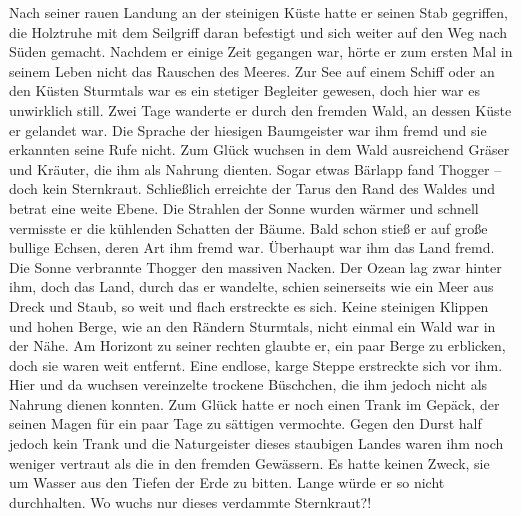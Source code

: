 \documentclass[10pt, a4paper, oneside]{book}
\begin{document}
\begin{multicols}{2}
Nach seiner rauen Landung an der steinigen Küste hatte er seinen Stab gegriffen, die Holztruhe mit dem Seilgriff daran befestigt und sich weiter auf den Weg nach Süden gemacht. Nachdem er einige Zeit gegangen war, hörte er zum ersten Mal in seinem Leben nicht das Rauschen des Meeres. Zur See auf einem Schiff oder an den Küsten Sturmtals war es ein stetiger Begleiter gewesen, doch hier war es unwirklich still. Zwei Tage wanderte er durch den fremden Wald, an dessen Küste er gelandet war. Die Sprache der hiesigen Baumgeister war ihm fremd und sie erkannten seine Rufe nicht. Zum Glück wuchsen in dem Wald ausreichend Gräser und Kräuter, die ihm als Nahrung dienten. Sogar etwas Bärlapp fand Thogger – doch kein Sternkraut. Schließlich erreichte der Tarus den Rand des Waldes und betrat eine weite Ebene. Die Strahlen der Sonne wurden wärmer und schnell vermisste er die kühlenden Schatten der Bäume. Bald schon stieß er auf große bullige Echsen, deren Art ihm fremd war. Überhaupt war ihm das Land fremd. Die Sonne verbrannte Thogger den massiven Nacken. Der Ozean lag zwar hinter ihm, doch das Land, durch das er wandelte, schien seinerseits wie ein Meer aus Dreck und Staub, so weit und flach erstreckte es sich. Keine steinigen Klippen und hohen Berge, wie an den Rändern Sturmtals, nicht einmal ein Wald war in der Nähe. Am Horizont zu seiner rechten glaubte er, ein paar Berge zu erblicken, doch sie waren weit entfernt. Eine endlose, karge Steppe erstreckte sich vor ihm. Hier und da wuchsen vereinzelte trockene Büschchen, die ihm jedoch nicht als Nahrung dienen konnten. Zum Glück hatte er noch einen Trank im Gepäck, der seinen Magen für ein paar Tage zu sättigen vermochte. Gegen den Durst half jedoch kein Trank und die Naturgeister dieses staubigen Landes waren ihm noch weniger vertraut als die in den fremden Gewässern. Es hatte keinen Zweck, sie um Wasser aus den Tiefen der Erde zu bitten. Lange würde er so nicht durchhalten. Wo wuchs nur dieses verdammte Sternkraut?!\bigskip


\end{multicols}
\end{document}
